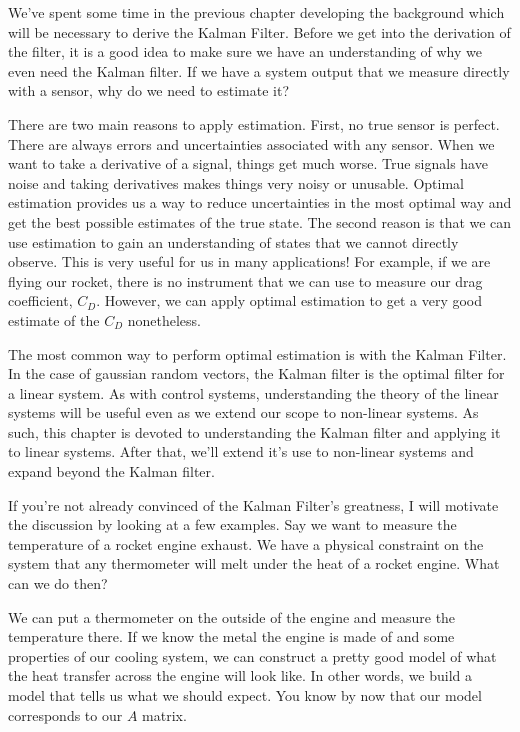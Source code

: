 We've spent some time in the previous chapter developing the background which will be necessary to derive the Kalman Filter. Before we get into the derivation of the filter, it is a good idea to make sure we have an understanding of why we even need the Kalman filter. If we have a system output that we measure directly with a sensor, why do we need to estimate it?

There are two main reasons to apply estimation. First, no true sensor is perfect. There are always errors and uncertainties associated with any sensor. When we want to take a derivative of a signal, things get much worse. True signals have noise and taking derivatives makes things very noisy or unusable. Optimal estimation provides us a way to reduce uncertainties in the most optimal way and get the best possible estimates of the true state. The second reason is that we can use estimation to gain an understanding of states that we cannot directly observe. This is very useful for us in many applications! For example, if we are flying our rocket, there is no instrument that we can use to measure our drag coefficient, $C_D$. However, we can apply optimal estimation to get a very good estimate of the $C_D$ nonetheless.

The most common way to perform optimal estimation is with the Kalman Filter. In the case of gaussian random vectors, the Kalman filter is the optimal filter for a linear system. As with control systems, understanding the theory of the linear systems will be useful even as we extend our scope to non-linear systems. As such, this chapter is devoted to understanding the Kalman filter and applying it to linear systems. After that, we'll extend it's use to non-linear systems and expand beyond the Kalman filter.

If you're not already convinced of the Kalman Filter's greatness, I will motivate the discussion by looking at a few examples. Say we want to measure the temperature of a rocket engine exhaust. We have a physical constraint on the system that any thermometer will melt under the heat of a rocket engine. What can we do then?

We can put a thermometer on the outside of the engine and measure the temperature there. If we know the metal the engine is made of and some properties of our cooling system, we can construct a pretty good model of what the heat transfer across the engine will look like. In other words, we build a model that tells us what we should expect. You know by now that our model corresponds to our $A$ matrix.

